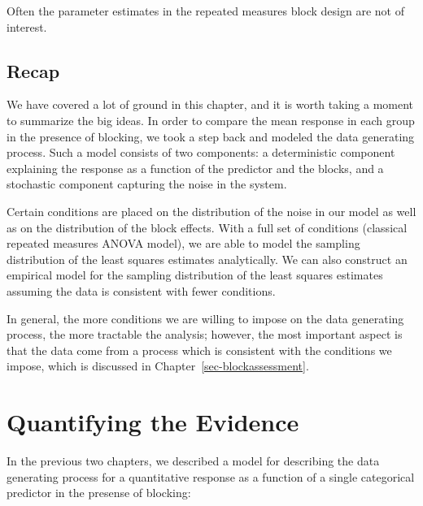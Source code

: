 \documentclass[
  letterpaper,
  DIV=11,
  numbers=noendperiod]{scrreprt}
\theoremstyle{definition}
\theoremstyle{definition}
\theoremstyle{plain}
\theoremstyle{remark}
\begin{document}
\begin{tcolorbox}[enhanced jigsaw, colbacktitle=quarto-callout-note-color!10!white, colback=white, left=2mm, title=\textcolor{quarto-callout-note-color}{\faInfo}\hspace{0.5em}{Note}, toptitle=1mm, leftrule=.75mm, breakable, bottomrule=.15mm, arc=.35mm, rightrule=.15mm, toprule=.15mm, coltitle=black, opacityback=0, colframe=quarto-callout-note-color-frame, opacitybacktitle=0.6, bottomtitle=1mm, titlerule=0mm]

Often the parameter estimates in the repeated measures block design are
not of interest.

\end{tcolorbox}

\section{Recap}\label{recap-2}

We have covered a lot of ground in this chapter, and it is worth taking
a moment to summarize the big ideas. In order to compare the mean
response in each group in the presence of blocking, we took a step back
and modeled the data generating process. Such a model consists of two
components: a deterministic component explaining the response as a
function of the predictor and the blocks, and a stochastic component
capturing the noise in the system.

Certain conditions are placed on the distribution of the noise in our
model as well as on the distribution of the block effects. With a full
set of conditions (classical repeated measures ANOVA model), we are able
to model the sampling distribution of the least squares estimates
analytically. We can also construct an empirical model for the sampling
distribution of the least squares estimates assuming the data is
consistent with fewer conditions.

In general, the more conditions we are willing to impose on the data
generating process, the more tractable the analysis; however, the most
important aspect is that the data come from a process which is
consistent with the conditions we impose, which is discussed in
Chapter~\ref{sec-blockassessment}.

\chapter{Quantifying the Evidence}\label{sec-blockteststat}

In the previous two chapters, we described a model for describing the
data generating process for a quantitative response as a function of a
single categorical predictor in the presense of blocking:
\end{document}
